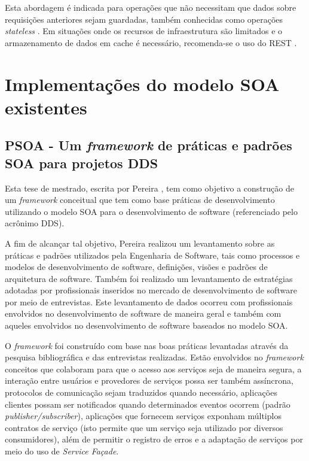 Esta abordagem é indicada para operações que não necessitam que dados sobre requisições anteriores sejam guardadas, também conhecidas como operações \textit{stateless} \cite{rozlog_restesoap_2013}. Em situações onde os recursos de infraestrutura são limitados e o armazenamento de dados em cache é necessário, recomenda-se o uso do REST \cite{rozlog_restesoap_2013}.

\section{Implementações do modelo SOA existentes}

\subsection{PSOA - Um \textit{framework} de práticas e padrões SOA para projetos DDS}

Esta tese de mestrado, escrita por Pereira \cite{pereira_psoa_2011}, tem como objetivo a construção de um \textit{framework} conceitual que tem como base práticas de desenvolvimento utilizando o modelo SOA para o desenvolvimento de software (referenciado pelo acrônimo DDS).

A fim de alcançar tal objetivo, Pereira \cite{pereira_psoa_2011} realizou um levantamento sobre as práticas e padrões utilizados pela Engenharia de Software, tais como processos e modelos de desenvolvimento de software, definições, visões e padrões de arquitetura de software. Também foi realizado um levantamento de estratégias adotadas por profissionais inseridos no mercado de desenvolvimento de software por meio de entrevistas. Este levantamento de dados ocorreu com profissionais envolvidos no desenvolvimento de software de maneira geral e também com aqueles envolvidos no desenvolvimento de software baseados no modelo SOA.

O \textit{framework} foi construído com base nas boas práticas levantadas através da pesquisa bibliográfica e das entrevistas realizadas. Estão envolvidos no \textit{framework} conceitos que colaboram para que o acesso aos serviços seja de maneira segura, a interação entre usuários e provedores de serviços possa ser também assíncrona, protocolos de comunicação sejam traduzidos quando necessário, aplicações clientes possam ser notificados quando determinados eventos ocorrem (padrão \textit{publisher/subscriber}), aplicações que fornecem serviços exponham múltiplos contratos de serviço (isto permite que um serviço seja utilizado por diversos consumidores), além de permitir o registro de erros e a adaptação de serviços por meio do uso de \textit{Service Façade}.

